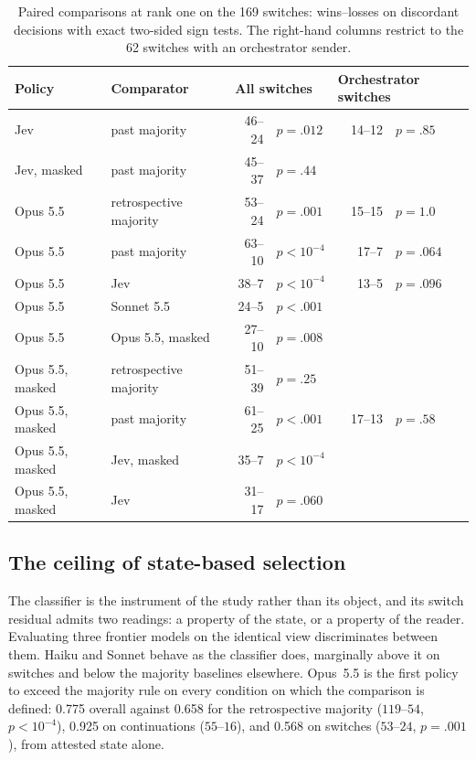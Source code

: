 \documentclass[11pt]{article}
\theoremstyle{definition}
\begin{document}
\begin{table}[t]
\centering\small
\caption{Paired comparisons at rank one on the 169 switches: wins--losses on discordant decisions with exact two-sided sign tests. The right-hand columns restrict to the 62 switches with an orchestrator sender.}
\label{tab:paired}
\begin{tabular}{llrlrl}
\toprule
Policy & Comparator & \multicolumn{2}{l}{All switches} & \multicolumn{2}{l}{Orchestrator switches} \\
\midrule
Jev & past majority & 46--24 & $p=.012$ & 14--12 & $p=.85$ \\
Jev, masked & past majority & 45--37 & $p=.44$ & & \\
Opus 5.5 & retrospective majority & 53--24 & $p=.001$ & 15--15 & $p=1.0$ \\
Opus 5.5 & past majority & 63--10 & $p<10^{-4}$ & 17--7 & $p=.064$ \\
Opus 5.5 & Jev & 38--7 & $p<10^{-4}$ & 13--5 & $p=.096$ \\
Opus 5.5 & Sonnet 5.5 & 24--5 & $p<.001$ & & \\
Opus 5.5 & Opus 5.5, masked & 27--10 & $p=.008$ & & \\
Opus 5.5, masked & retrospective majority & 51--39 & $p=.25$ & & \\
Opus 5.5, masked & past majority & 61--25 & $p<.001$ & 17--13 & $p=.58$ \\
Opus 5.5, masked & Jev, masked & 35--7 & $p<10^{-4}$ & & \\
Opus 5.5, masked & Jev & 31--17 & $p=.060$ & & \\
\bottomrule
\end{tabular}
\end{table}

\subsection{The ceiling of state-based selection}
\label{sec:frontier}

The classifier is the instrument of the study rather than its object, and its switch residual admits two readings: a property of the state, or a property of the reader. Evaluating three frontier models on the identical view discriminates between them. Haiku and Sonnet behave as the classifier does, marginally above it on switches and below the majority baselines elsewhere. Opus~5.5 is the first policy to exceed the majority rule on every condition on which the comparison is defined: 0.775 overall against 0.658 for the retrospective majority ($119$--$54$, $p<10^{-4}$), 0.925 on continuations ($55$--$16$), and 0.568 on switches ($53$--$24$, $p = .001$), from attested state alone.
\end{document}
